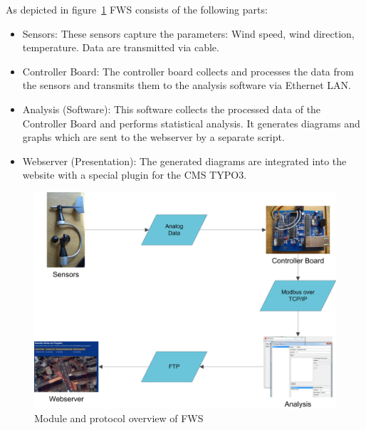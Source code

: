 As depicted in figure~\ref{fig:fws_overview} FWS consists of the following parts:
\begin{itemize}
\item Sensors: These sensors capture the parameters: Wind speed, wind direction, temperature. Data are transmitted via cable.
\item Controller Board: The controller board collects and processes the data from the sensors and transmits them to the analysis software via Ethernet LAN.
\item Analysis (Software): This software collects the processed data of the Controller Board and performs statistical analysis. It generates diagrams and graphs which are sent to the webserver by a separate script.
\item Webserver (Presentation): The generated diagrams are integrated into the website with a special plugin for the CMS TYPO3.
\end{itemize}

\begin{figure}[ht]
    \centering
    \includegraphics[width=\linewidth]{graphics/overview.jpg}
    \caption{Module and protocol overview of FWS}
    \label{fig:fws_overview}
\end{figure}

